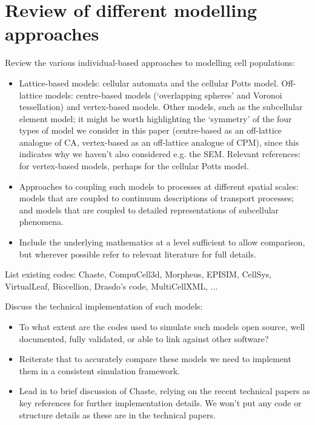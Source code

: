 \documentclass{article}
\begin{document}
\section{Review of different modelling approaches}\label{sec:discrete_models}
Review the various individual-based approaches to modelling cell populations:
\begin{itemize}
\item Lattice-based models: cellular automata and the cellular Potts model. Off-lattice models: centre-based models (`overlapping spheres' and Voronoi tessellation) and vertex-based models. Other models, such as the subcellular element model; it might be worth highlighting the `symmetry' of the four types of model we consider in this paper (centre-based as an off-lattice analogue of CA, vertex-based as an off-lattice analogue of CPM), since this indicates why we haven't also considered e.g. the SEM. Relevant references: \citet{Fletcher2013Implementing, Fletcher2014Vertex} for vertex-based models, perhaps \citet{VossBohme2012Mulit-scale} for the cellular Potts model.
\item Approaches to coupling such models to processes at different spatial scales: models that are coupled to continuum descriptions of transport processes; and models that are coupled to detailed representations of subcellular phenomena.
\item Include the underlying mathematics at a level sufficient to allow comparison, but wherever possible refer to relevant literature for full details.
\end{itemize} 

\noindent List existing codes: Chaste, CompuCell3d, Morpheus, EPISIM, CellSys, VirtualLeaf, Biocellion, Drasdo's code, MultiCellXML, ...

\noindent Discuss the technical implementation of such models:
\begin{itemize}
\item To what extent are the codes used to simulate such models open source, well documented, fully validated, or able to link against other software?
\item Reiterate that to accurately compare these models we need to implement them in a consistent simulation framework.
\item Lead in to brief discussion of Chaste, relying on the recent technical papers as key references for further implementation details. We won't put any code or structure details as these are in the technical papers.
\end{itemize}
\end{document}
